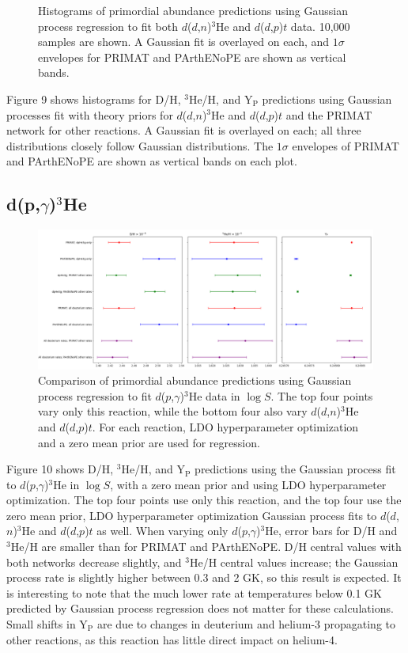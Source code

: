 \documentclass[%
 reprint,
superscriptaddress,
nofootinbib,
 amsmath,amssymb,
 aps,
 pra,
]{revtex4-2}
\begin{document}
\begin{figure}
\begin{minipage}{0.32\textwidth}
	\end{minipage}
	\caption{Histograms of primordial abundance predictions using Gaussian process regression to fit both $d$($d$,$n$)$^3$He and $d$($d$,$p$)$t$ data. 10,000 samples are shown. A Gaussian fit is overlayed on each, and $1\sigma$ envelopes for PRIMAT and PArthENoPE are shown as vertical bands.}
\end{figure}

Figure 9 shows histograms for D/H, $^3$He/H, and Y$_\text{P}$ predictions using Gaussian processes fit with theory priors for $d$($d$,$n$)$^3$He and $d$($d$,$p$)$t$ and the PRIMAT network for other reactions. A Gaussian fit is overlayed on each; all three distributions closely follow Gaussian distributions. The $1\sigma$ envelopes of PRIMAT and PArthENoPE are shown as vertical bands on each plot. 

\subsection{d(p,$\gamma$)$^3$He}

\begin{figure}
	\centering
	\includegraphics[width=0.98\linewidth]{Figures/dphe3g_comp.png}
	\caption{Comparison of primordial abundance predictions using Gaussian process regression to fit $d$($p$,$\gamma$)$^3$He data in $\log S$. The top four points vary only this reaction, while the bottom four also vary $d$($d$,$n$)$^3$He and $d$($d$,$p$)$t$. For each reaction, LDO hyperparameter optimization and a zero mean prior are used for regression. }
\end{figure}

Figure 10 shows D/H, $^3$He/H, and Y$_\text{P}$ predictions using the Gaussian process fit to $d$($p$,$\gamma$)$^3$He in $\log S$, with a zero mean prior and using LDO hyperparameter optimization. The top four points use only this reaction, and the top four use the zero mean prior, LDO hyperparameter optimization Gaussian process fits to $d$($d$,$n$)$^3$He and $d$($d$,$p$)$t$ as well. When varying only $d$($p$,$\gamma$)$^3$He, error bars for D/H and $^3$He/H are smaller than for PRIMAT and PArthENoPE. D/H central values with both networks decrease slightly, and $^3$He/H central values increase; the Gaussian process rate is slightly higher between 0.3 and 2 GK, so this result is expected. It is interesting to note that the much lower rate at temperatures below 0.1 GK predicted by Gaussian process regression does not matter for these calculations. Small shifts in Y$_\text{P}$ are due to changes in deuterium and helium-3 propagating to other reactions, as this reaction has little direct impact on helium-4. 
\end{document}
